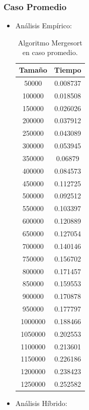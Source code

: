\documentclass[a4paper,12pt,twoside]{article} %
\begin{document}
	\subsubsection{Caso Promedio}
	\begin{itemize}
	
		\item Análisis Empírico:
		
\begin{table}[h]
	\begin{center}
		\begin{tabular}{|c|c|}
		\hline
		Tamaño & Tiempo \\
		\hline
		50000 & 0.008737 \\	
		100000 & 0.018508 \\	
		150000 & 0.026026 \\	
		200000 & 0.037912 \\	
		250000 & 0.043089 \\	
		300000 & 0.053945 \\	
		350000 & 0.06879 \\	
		400000 & 0.084573 \\	
		450000 & 0.112725 \\	
		500000 & 0.092512 \\	
		550000 & 0.103397 \\	
		600000 & 0.120889 \\	
		650000 & 0.127054 \\	
		700000 & 0.140146 \\	
		750000 & 0.156702 \\	
		800000 & 0.171457 \\	
		850000 & 0.159553 \\	
		900000 & 0.170878 \\	
		950000 & 0.177797 \\	
		1000000 & 0.188466 \\	
		1050000 & 0.202553 \\	
		1100000 & 0.213601 \\	
		1150000 & 0.226186 \\	
		1200000 & 0.238423 \\	
		1250000 & 0.252582 \\	
		\hline
		\end{tabular}
	\end{center}
	\caption{Algoritmo Mergesort en caso promedio.}
\end{table}
\newpage
		
		\item Análisis Híbrido:
		

\end{itemize}
\end{document}
